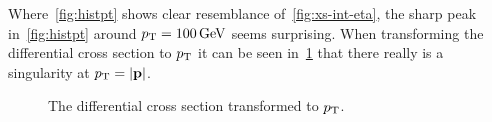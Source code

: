 Where~\ref{fig:histpt} shows clear resemblance
of~\ref{fig:xs-int-eta}, the sharp peak in~\ref{fig:histpt} around
\(p_\mathrm{T}=\SI{100}{\giga\electronvolt}\) seems surprising. When
transforming the differential cross section to \(p_\mathrm{T}\) it can be seen
in~\ref{fig:diff-xs-pt} that there really is a singularity at
\(p_\mathrm{T} =\abs{\vb{p}}\).

\begin{figure}[ht]
  \centering
  \caption{\label{fig:diff-xs-pt} The differential cross section
    transformed to \(p_\mathrm{T}\).}
\end{figure}
